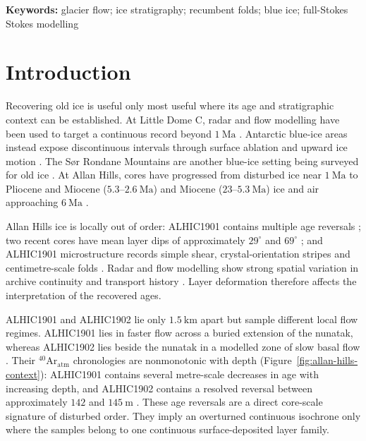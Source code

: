 \documentclass[review]{igs}
\providecommand{\DIFadd}[1]{{\protect\color{blue} \sf #1}} %
\providecommand{\DIFdel}[1]{{\protect\color{red} \scriptsize #1}} %
\providecommand{\DIFaddbegin}{} %
\providecommand{\DIFaddend}{} %
\providecommand{\DIFdelbegin}{} %
\providecommand{\DIFdelend}{} %
\newcommand{\DIFscaledelfig}{0.5}
\newlength{\DIFdelgraphicswidth} %
\newlength{\DIFdelgraphicsheight} %
\newcommand{\DIFaddincludegraphics}[2][]{{\color{blue}\fbox{\DIFOincludegraphics[#1]{#2}}}} %
\newcommand{\DIFdelincludegraphics}[2][]{%
\sbox{\DIFdelgraphicsbox}{\DIFOincludegraphics[#1]{#2}}%
\settoboxwidth{\DIFdelgraphicswidth}{\DIFdelgraphicsbox} %
\settoboxtotalheight{\DIFdelgraphicsheight}{\DIFdelgraphicsbox} %
\scalebox{\DIFscaledelfig}{%
\parbox[b]{\DIFdelgraphicswidth}{\usebox{\DIFdelgraphicsbox}\\[-\baselineskip] \rule{\DIFdelgraphicswidth}{0em}}\llap{\resizebox{\DIFdelgraphicswidth}{\DIFdelgraphicsheight}{%
\setlength{\unitlength}{\DIFdelgraphicswidth}%
\begin{picture}(1,1)%
\thicklines\linethickness{2pt} %
{\color[rgb]{1,0,0}\put(0,0){\framebox(1,1){}}}%
{\color[rgb]{1,0,0}\put(0,0){\line( 1,1){1}}}%
{\color[rgb]{1,0,0}\put(0,1){\line(1,-1){1}}}%
\end{picture}%
}\hspace*{3pt}}} %
} %
\DeclareRobustCommand{\DIFaddbegin}{\DIFOaddbegin \let\includegraphics\DIFaddincludegraphics} %
\DeclareRobustCommand{\DIFaddend}{\DIFOaddend \let\includegraphics\DIFOincludegraphics} %
\DeclareRobustCommand{\DIFdelbegin}{\DIFOdelbegin \let\includegraphics\DIFdelincludegraphics} %
\DeclareRobustCommand{\DIFdelend}{\DIFOaddend \let\includegraphics\DIFOincludegraphics} %
\begin{document}
\noindent\textbf{Keywords:} glacier flow; ice stratigraphy; recumbent folds; blue ice; \DIFdelbegin \DIFdel{full-Stokes }\DIFdelend \DIFaddbegin \DIFadd{Stokes }\DIFaddend modelling

\section{Introduction}

Recovering old ice is \DIFdelbegin \DIFdel{useful only }\DIFdelend \DIFaddbegin \DIFadd{most useful }\DIFaddend where its age and stratigraphic context can be established. At Little Dome C, radar and flow modelling have been used to target a continuous record beyond \(1~\mathrm{Ma}\) \citep{Lilien2021,Chung2025BeyondEPICA}. Antarctic blue-ice areas instead expose discontinuous intervals through surface ablation and upward ice motion \citep{Bintanja1999,Spaulding2012}. The S{\o}r Rondane Mountains are another blue-ice setting being surveyed for old ice \citep{Izeboud2026}. At Allan Hills, cores have progressed from disturbed ice near \(1~\mathrm{Ma}\) to Pliocene \DIFdelbegin \DIFdel{and Miocene }\DIFdelend \DIFaddbegin \DIFadd{(\(5.3\)--\(2.6~\mathrm{Ma}\)) and Miocene (\(23\)--\(5.3~\mathrm{Ma}\)) }\DIFaddend ice and air approaching \(6~\mathrm{Ma}\) \citep{Higgins2015,Yan2019,Shackleton2025}.

Allan Hills ice is locally out of order: ALHIC1901 contains multiple age reversals \citep{Shackleton2025}; two recent cores have mean layer dips of approximately \(29^{\circ}\) and \(69^{\circ}\) \citep{Kirkpatrick2025}; and ALHIC1901 microstructure records simple shear, crystal-orientation stripes and centimetre-scale folds \citep{Stoll2026}. Radar and flow modelling show strong spatial variation in archive continuity and transport history \citep{Kehrl2018,Manos2026}. Layer deformation therefore affects the interpretation of the recovered ages.

\DIFaddbegin \DIFadd{ALHIC1901 and ALHIC1902 lie only \(1.5~\mathrm{km}\) apart but sample different local flow regimes. ALHIC1901 lies in faster flow across a buried extension of the nunatak, whereas ALHIC1902 lies beside the nunatak in a modelled zone of slow basal flow \citep{Manos2026}. Their \(^{40}\mathrm{Ar}_{\mathrm{atm}}\) chronologies are nonmonotonic with depth (Figure~\ref{fig:allan-hills-context}): ALHIC1901 contains several metre-scale decreases in age with increasing depth, and ALHIC1902 contains a resolved reversal between approximately \(142\) and \(145~\mathrm{m}\) \citep{Shackleton2025,MarksPeterson2026}. These age reversals are a direct core-scale signature of disturbed order. They imply an overturned continuous isochrone only where the samples belong to one continuous surface-deposited layer family.
}
\end{document}
